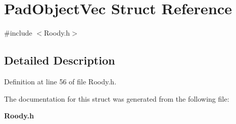 \section{PadObjectVec Struct Reference}
\label{structPadObjectVec}


{\ttfamily \#include $<$Roody.h$>$}



\subsection{Detailed Description}


Definition at line 56 of file Roody.h.



The documentation for this struct was generated from the following file:\begin{DoxyCompactItemize}
\item 
{\bf Roody.h}\end{DoxyCompactItemize}
